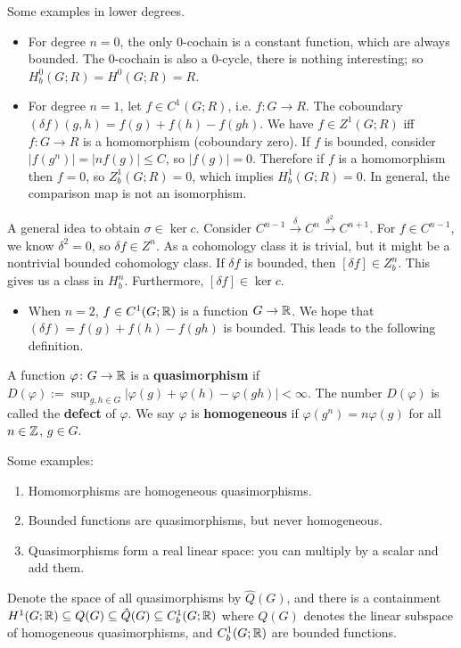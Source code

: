 \begin{example}
    Some examples in lower degrees.
    \begin{itemize}
    \setlength\itemsep{-.2em}
\item For degree $n=0$, the only 0-cochain is a constant function, which are always bounded. The 0-cochain is also a 0-cycle, there is nothing interesting; so $H^0_b(G;R)=H^0(G;R)=R$.
\item For degree $n=1$, let $f \in C^1 (G;R)$, i.e. $f \colon G \to R$. The coboundary $(\delta f)(g,h)=f(g)+f(h)-f(gh)$. We have $f \in Z^1(G;R)$ iff $f \colon G \to R$ is a homomorphism (coboundary zero). If $f$ is bounded, consider $|f(g^n )|=|n f(g)| \leq C$, so $|f(g)|=0$. Therefore if $f$ is a homomorphism then $f=0$, so $Z^1_b(G;R)=0$, which implies $H^1_b(G;R)=0$. In general, the comparison map is not an isomorphism.
    \end{itemize}
    A general idea to obtain $\sigma \in \ker c$. Consider $C^{n-1}\xrightarrow{\delta} C^n  \xrightarrow{\delta^2} C^{n+1}$. For $f \in C^{n-1}$, we know $\delta ^2=0$, so $\delta f \in Z^n $. As a cohomology class it is trivial, but it might be a nontrivial bounded cohomology class. If $\delta f$ is bounded, then $[\delta f] \in Z^n _b$. This gives us a class in $H^n _b$. Furthermore, $[\delta f] \in \ker c$.
    \begin{itemize}
    \setlength\itemsep{-.2em}
\item When $n=2$, $f \in C^1(G;\mathbb{R})$ is a function $G \to \mathbb{R}$. We hope that $(\delta f)=f(g)+f(h)-f(gh)$ is bounded. This leads to the following definition.
    \end{itemize}
\end{example}
    \begin{definition}[]
        A function $\varphi \colon G \to \mathbb{R}$ is a \textbf{quasimorphism} if $D(\varphi ):=\sup _{g,h \in G}|\varphi (g)+\varphi (h)-\varphi (gh)|<\infty$. The number $D(\varphi )$ is called the \textbf{defect} of $\varphi $. We say $\varphi $ is \textbf{homogeneous} if $\varphi (g^n )=n \varphi (g)$ for all $n \in \mathbb{Z}$, $g \in G$.
    \end{definition}
    \begin{example}
       Some examples:
       \begin{enumerate}[label=(\arabic*)]
       \setlength\itemsep{-.2em}
           \item Homomorphisms are homogeneous quasimorphisms.
            \item Bounded functions are quasimorphisms, but never homogeneous.
            \item Quasimorphisms form a real linear space: you can multiply by a scalar and add them. 
       \end{enumerate}Denote the space of all quasimorphisms by $\hat{Q}(G)$, and there is a containment $H^1(G;\mathbb{R}) \subseteq Q(G) \subseteq \hat{Q}(G) \subseteq C^1_b(G;\mathbb{R})$ where $Q(G)$ denotes the linear subspace of homogeneous quasimorphisms, and  $C^1_b(G;\mathbb{R})$ are bounded functions.
    \end{example}
